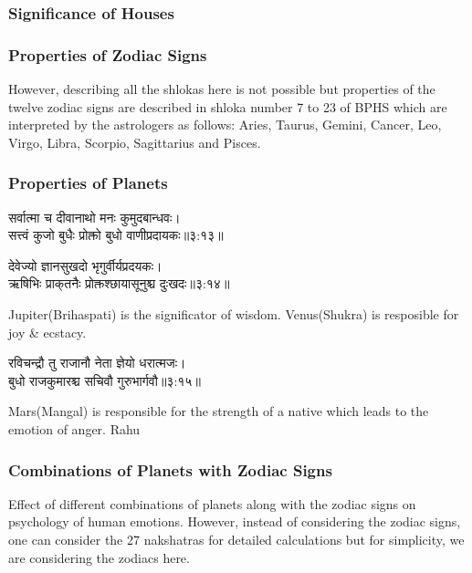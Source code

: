 \subsubsection{Significance of Houses}

\subsubsection{Properties of Zodiac Signs}
However, describing all the shlokas here is not possible but properties of the twelve zodiac signs are described in shloka number 7 to 23 of BPHS\cite{BrihatParasharHoraShastraVol1}\cite{wiki:bphs} which are interpreted by the astrologers as follows:
Aries, Taurus, Gemini, Cancer, Leo, Virgo, Libra, Scorpio, Sagittarius and Pisces.

\subsubsection{Properties of Planets}
\begin{sanskrit}
	\begin{center}
		सर्वात्मा च दीवानाथो मनः कुमुदबान्धवः।\\सत्त्वं कुजो बुधैः प्रोक्तो बुधो वाणीप्रदायकः॥३:१३॥\cite{BrihatParasharHoraShastraVol1}\cite{wiki:bphs}
	\end{center}
\end{sanskrit}
\begin{sanskrit}
	\begin{center}
		देवेज्यो ज्ञानसुखदो भृगुर्वीर्यप्रदयकः।\\ऋषिभिः प्राक्‌तनैः प्रोक्तश्छायासूनुश्च दुःखदः॥३:१४॥\cite{BrihatParasharHoraShastraVol1}\cite{wiki:bphs}
	\end{center}
\end{sanskrit}
Jupiter(Brihaspati) is the significator of wisdom. 
Venus(Shukra) is resposible for joy \& ecstacy.
\begin{sanskrit}
	\begin{center}
		रविचन्द्रौ तु राजानौ नेता ज्ञेयो धरात्मजः।\\बुधो राजकुमारश्च सचिवौ गुरुभार्गवौ॥३:१५॥\cite{BrihatParasharHoraShastraVol1}\cite{wiki:bphs}
	\end{center}
\end{sanskrit}
Mars(Mangal) is responsible for the strength of a native which leads to the emotion of anger.
Rahu
\subsubsection{Combinations of Planets with Zodiac Signs}
Effect of different combinations of planets along with the zodiac signs on psychology of human emotions.
However, instead of considering the zodiac signs, one can consider the 27 nakshatras for detailed calculations but for simplicity, we are considering the zodiacs here.
